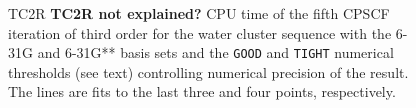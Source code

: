 \documentclass[prl,aps,letterpaper,twocolumn,showpacs,twocolumngrid,superbib]{revtex4}
\begin{document}
\begin{figure}[t]
  \caption{\protect
    TC2R {\bf TC2R not explained?} CPU time of the fifth CPSCF iteration of third order for
    the water cluster sequence with the 6-31G and 6-31G** 
    basis sets and the {\tt GOOD} and {\tt TIGHT} 
    numerical thresholds (see text) controlling numerical
    precision of the result. The lines are fits to the 
    last three and four points, respectively.
  }\label{fig:Gamma_TC2R_Timing}
\end{figure}
\end{document}
